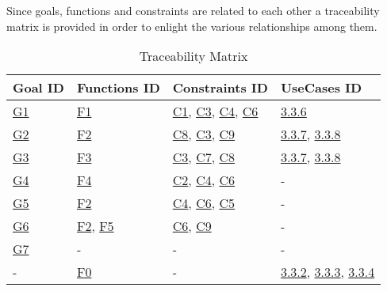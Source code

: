 Since goals, functions and constraints are related to each other a traceability matrix is provided in order to enlight the various relationships among them.
\begin{flushleft}

\begin{table}[htp]
\centering
\begin{tabular}{|l|l|l|l|}
\hline
Goal ID&Functions ID&Constraints ID&UseCases ID\\
\hline
\hyperlink{G1}{G1}&\hyperlink{sec:f1}{F1}&\hyperlink{C1}{C1}, \hyperlink{C3}{C3}, \hyperlink{C4}{C4}, \hyperlink{C6}{C6}&\hyperlink{tab:reportcreationtab}{3.3.6}\\
\hline
\hyperlink{G2}{G2}&\hyperlink{sec:f2}{F2}&\hyperlink{C8}{C8}, \hyperlink{C3}{C3}, \hyperlink{C9}{C9}&\hyperlink{tab:dataminingtab}{3.3.7}, \hyperlink{tab:dataminingofficertab}{3.3.8}\\
\hline
\hyperlink{G3}{G3}&\hyperlink{sec:f3}{F3}&\hyperlink{C3}{C3}, \hyperlink{C7}{C7}, \hyperlink{C8}{C8}&\hyperlink{tab:dataminingtab}{3.3.7}, \hyperlink{tab:dataminingofficertab}{3.3.8}\\
\hline
\hyperlink{G4}{G4}&\hyperlink{sec:f4}{F4}&\hyperlink{C2}{C2}, \hyperlink{C4}{C4}, \hyperlink{C6}{C6}&-\\
\hline
\hyperlink{G5}{G5}&\hyperlink{sec:f2}{F2}&\hyperlink{C4}{C4}, \hyperlink{C6}{C6}, \hyperlink{C5}{C5}&-\\
\hline
\hyperlink{G6}{G6}&\hyperlink{sec:f2}{F2}, \hyperlink{sec:f5}{F5}&\hyperlink{C6}{C6}, \hyperlink{C9}{C9}&-\\
\hline
\hyperlink{G7}{G7}&-&-&-\\
\hline
-&\hyperlink{sec:f0}{F0}&-&\hyperlink{tab:signupusecase}{3.3.2}, \hyperlink{tab:loginusecase}{3.3.3}, \hyperlink{tab:recoverpasswordusecase}{3.3.4}\\
\hline

\end{tabular}

\caption{Traceability Matrix} 

\end{table}

\end{flushleft}